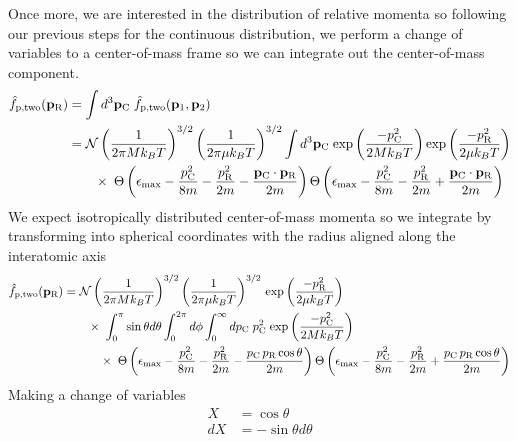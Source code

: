 Once more, we are interested in the distribution of relative momenta so following our previous steps for the continuous distribution, we perform a change of variables to a center-of-mass frame so we can integrate out the center-of-mass component.
\begin{equation}
\begin{split}
	 \hat{f}_\text{p,two}(\mathbf{p}_{\text{R}}) & = \int d^3 \mathbf{p}_\text{C} \; \hat{f}_{\text{p,two}} (\mathbf{p}_1, \mathbf{p}_2) \\
	 &= \mathcal{N} \left(\frac{1}{2 \pi M k_B T}\right)^{3/2} \left(\frac{1}{2 \pi \mu k_B T}\right)^{3/2} \int d^3 \mathbf{p}_\text{C} \; \text{exp}\left( {\frac{-p_\text{C}^2}{2 M k_B T}} \right) \text{exp}\left( {\frac{-p_\text{R}^2}{2 \mu k_B T}} \right) \\ 
	 &\quad\quad \times \; 
	 \Theta \left( {\epsilon_\text{max} - \frac{p_\text{C}^2}{8m} - \frac{p_\text{R}^2}{2m} - \frac{\mathbf{p}_\text{C} \cdot \mathbf{p}_\text{R}}{2m}} \right) 
	 \Theta \left( {\epsilon_\text{max} - \frac{p_\text{C}^2}{8m} - \frac{p_\text{R}^2}{2m} + \frac{\mathbf{p}_\text{C} \cdot \mathbf{p}_\text{R}}{2m}} \right) 
\end{split}
\end{equation}
We expect isotropically distributed center-of-mass momenta so we integrate by transforming into spherical coordinates with the radius aligned along the interatomic axis
\begin{equation}
\begin{split}
	 \hat{f}_\text{p,two}(\mathbf{p}_{\text{R}}) &= \mathcal{N} \left(\frac{1}{2 \pi M k_B T}\right)^{3/2} \left(\frac{1}{2 \pi \mu k_B T}\right)^{3/2} \,\text{exp}\left( {\frac{-p_\text{R}^2}{2 \mu k_B T}} \right) \\
	 &\quad\quad \times \; \int_0^{\pi} \sin \theta d\theta \int_0^{2\pi} d\phi \int_0^{\infty} dp_\text{C} \; p_\text{C}^2 \; \text{exp}\left( {\frac{-p_\text{C}^2}{2 M k_B T}} \right) \\ 
	 &\quad\quad\quad \times \; \Theta \left( {\epsilon_\text{max} - \frac{p_\text{C}^2}{8m} - \frac{p_\text{R}^2}{2m} - \frac{p_\text{C} \, p_\text{R} \cos \theta}{2m}} \right) \Theta \left( {\epsilon_\text{max} - \frac{p_\text{C}^2}{8m} - \frac{p_\text{R}^2}{2m} + \frac{p_\text{C} \, p_\text{R} \cos \theta}{2m}} \right) 
\end{split}
\end{equation}
Making a change of variables
\begin{equation*}
\begin{split}
	X  &= \cos \theta \\
	dX &= - \sin \theta d \theta
\end{split}
\end{equation*}
